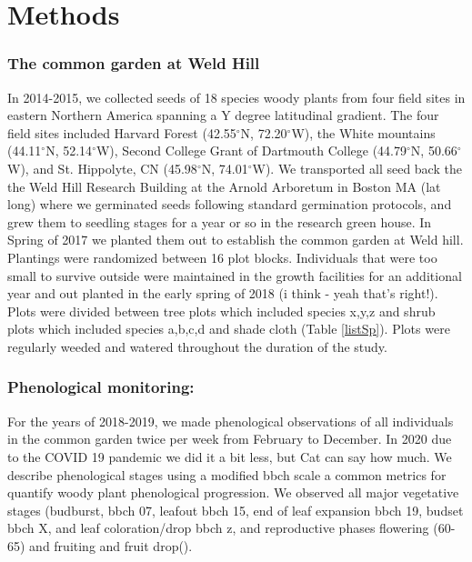 \documentclass[12 pt]{article}
\begin{document}
\section{Methods} %
\subsubsection{The common garden at Weld Hill}
In 2014-2015, we collected seeds of 18 species woody plants from four field sites in eastern Northern America spanning a Y degree latitudinal gradient. The four field sites included Harvard Forest (42.55$^{\circ}$N, 72.20$^{\circ}$W), the White mountains (44.11$^{\circ}$N, 52.14$^{\circ}$W), Second College Grant of Dartmouth College (44.79$^{\circ}$N, 50.66$^{\circ}$W), and St. Hippolyte, CN (45.98$^{\circ}$N, 74.01$^{\circ}$W). We transported all seed back the the Weld Hill Research Building at the Arnold Arboretum in Boston MA (lat long) where we germinated seeds following standard germination protocols, and grew them to seedling stages for a year or so in the research green house. In Spring of 2017 we planted them out to establish the common garden at Weld hill. Plantings were randomized between 16 plot blocks. Individuals that were too small to survive outside were maintained in the growth facilities for an additional year and out planted in the early spring of 2018 (i think - yeah that's right!). Plots were divided between tree plots which included species x,y,z and shrub plots which included species a,b,c,d and shade cloth (Table \ref{listSp}). Plots were regularly weeded and watered throughout the duration of the study.

\subsubsection{Phenological monitoring:}
For the years of 2018-2019, we made phenological observations of all individuals in the common garden twice per week from February to December. In 2020 due to the COVID 19 pandemic we did it a bit less, but Cat can say how much.
We describe phenological stages using a modified bbch scale \citep{} a common metrics for quantify woody plant phenological progression. We observed all major vegetative stages (budburst, bbch 07, leafout bbch 15, end of leaf expansion bbch 19, budset bbch X, and leaf coloration/drop bbch z, and reproductive phases flowering (60-65) and fruiting and fruit drop(). 
\end{document}
